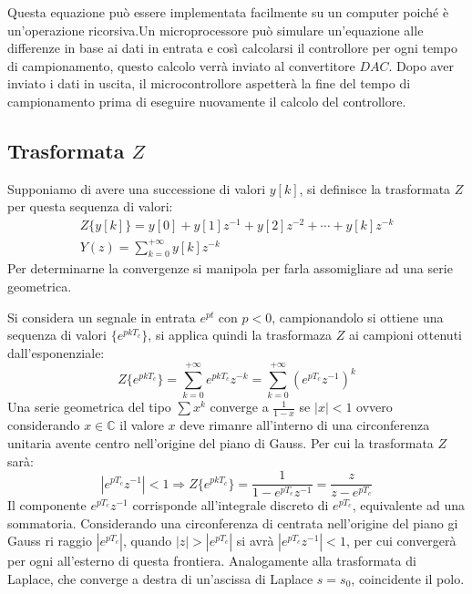 \documentclass{article}
\numberwithin{equation}{subsection}
\begin{document}
Questa equazione può essere implementata facilmente su un computer poiché è un'operazione ricorsiva.Un microprocessore può simulare un'equazione alle differenze in base ai 
dati in entrata e così calcolarsi il controllore per ogni tempo di campionamento, questo calcolo 
verrà inviato al 
convertitore $DAC$. Dopo aver inviato i dati in uscita, il microcontrollore aspetterà la fine del tempo di campionamento prima di eseguire nuovamente il calcolo 
del controllore. 

\subsection{Trasformata $Z$}

Supponiamo di avere una successione di valori $y[k]$, si definisce la trasformata $Z$ per questa sequenza di valori:
\begin{gather}
    Z\{y[k]\}=y[0]+y[1]z^{-1}+y[2]z^{-2}+\cdots+y[k]z^{-k}\\
    Y(z)=\sum_{k=0}^{+\infty}y[k]z^{-k}
\end{gather}
Per determinarne la convergenze si manipola per farla assomigliare ad una serie geometrica. 

Si considera un segnale in entrata $e^{pt}$ con $p<0$, campionandolo si ottiene una sequenza di valori $\{e^{pkT_c}\}$, si applica quindi la trasformaza $Z$ ai campioni 
ottenuti dall'esponenziale:
\begin{equation}
    Z\{e^{pkT_c}\}=\sum_{k=0}^{+\infty}e^{pkT_c}z^{-k}=\sum_{k=0}^{+\infty}\left(e^{pT_c}z^{-1}\right)^k
\end{equation}
Una serie geometrica del tipo $\sum x^k$ converge a $\displaystyle\frac{1}{1-x}$ se $|x|<1$ ovvero considerando $x\in\mathbb{C}$ il valore $x$ deve rimanre all'interno 
di una circonferenza unitaria avente centro nell'origine del piano di Gauss. Per cui la trasformata $Z$ sarà: 
\begin{equation}
    |e^{pT_c}z^{-1}|<1\Rightarrow Z\{e^{pkT_c}\}=\displaystyle\frac{1}{1-e^{pT_c}z^{-1}}=\frac{z}{z-e^{pT_c}}
\end{equation}
Il componente $e^{pT_c}z^{-1}$ corrisponde all'integrale discreto di $e^{pT_c}$, equivalente ad una sommatoria. Considerando una circonferenza di centrata nell'origine 
del piano gi Gauss ri raggio $|e^{pT_c}|$, quando $|z|>|e^{pT_c}|$ si avrà $|e^{pT_c}z^{-1}|<1$, per cui convergerà per ogni all'esterno di questa frontiera. 
Analogamente alla trasformata di Laplace, che converge a destra di un'ascissa di Laplace $s=s_0$, coincidente il polo. 
\end{document}
